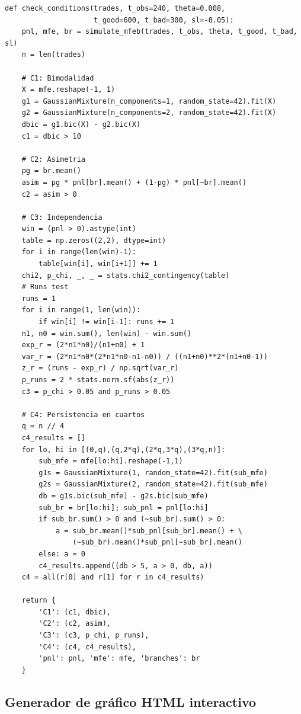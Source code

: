 \documentclass[11pt,a4paper]{article}
\begin{document}
\begin{lstlisting}[caption={Test de C1--C4}]
def check_conditions(trades, t_obs=240, theta=0.008,
                     t_good=600, t_bad=300, sl=-0.05):
    pnl, mfe, br = simulate_mfeb(trades, t_obs, theta, t_good, t_bad, sl)
    n = len(trades)
    
    # C1: Bimodalidad
    X = mfe.reshape(-1, 1)
    g1 = GaussianMixture(n_components=1, random_state=42).fit(X)
    g2 = GaussianMixture(n_components=2, random_state=42).fit(X)
    dbic = g1.bic(X) - g2.bic(X)
    c1 = dbic > 10
    
    # C2: Asimetria
    pg = br.mean()
    asim = pg * pnl[br].mean() + (1-pg) * pnl[~br].mean()
    c2 = asim > 0
    
    # C3: Independencia
    win = (pnl > 0).astype(int)
    table = np.zeros((2,2), dtype=int)
    for i in range(len(win)-1):
        table[win[i], win[i+1]] += 1
    chi2, p_chi, _, _ = stats.chi2_contingency(table)
    # Runs test
    runs = 1
    for i in range(1, len(win)):
        if win[i] != win[i-1]: runs += 1
    n1, n0 = win.sum(), len(win) - win.sum()
    exp_r = (2*n1*n0)/(n1+n0) + 1
    var_r = (2*n1*n0*(2*n1*n0-n1-n0)) / ((n1+n0)**2*(n1+n0-1))
    z_r = (runs - exp_r) / np.sqrt(var_r)
    p_runs = 2 * stats.norm.sf(abs(z_r))
    c3 = p_chi > 0.05 and p_runs > 0.05
    
    # C4: Persistencia en cuartos
    q = n // 4
    c4_results = []
    for lo, hi in [(0,q),(q,2*q),(2*q,3*q),(3*q,n)]:
        sub_mfe = mfe[lo:hi].reshape(-1,1)
        g1s = GaussianMixture(1, random_state=42).fit(sub_mfe)
        g2s = GaussianMixture(2, random_state=42).fit(sub_mfe)
        db = g1s.bic(sub_mfe) - g2s.bic(sub_mfe)
        sub_br = br[lo:hi]; sub_pnl = pnl[lo:hi]
        if sub_br.sum() > 0 and (~sub_br).sum() > 0:
            a = sub_br.mean()*sub_pnl[sub_br].mean() + \
                (~sub_br).mean()*sub_pnl[~sub_br].mean()
        else: a = 0
        c4_results.append((db > 5, a > 0, db, a))
    c4 = all(r[0] and r[1] for r in c4_results)
    
    return {
        'C1': (c1, dbic),
        'C2': (c2, asim),
        'C3': (c3, p_chi, p_runs),
        'C4': (c4, c4_results),
        'pnl': pnl, 'mfe': mfe, 'branches': br
    }
\end{lstlisting}
 
\subsection{Generador de gráfico HTML interactivo}
 
\end{document}
